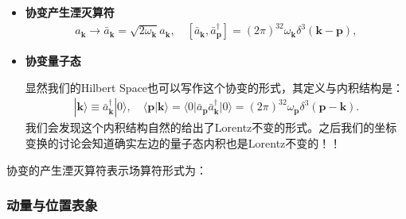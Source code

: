 \begin{itemize}
  \item \textbf{协变产生湮灭算符}
    \begin{align}
      a_\mathbf{k}\to \bar{a}_{\mathbf{k}} =
      \sqrt{2\omega_{\mathbf{k}}} a_{\mathbf{k}}, \quad
      \left[\bar{a}_{\mathbf{k}},\bar{a}_{\mathbf{p}}^{\dagger}\right]=(2\pi)^32\omega_{\mathbf{k}}\delta^3(\mathbf{k-p}),
    \end{align}
  \item \textbf{协变量子态}

    显然我们的Hilbert Space也可以写作这个协变的形式，其定义与内积结构是：
    \begin{align}
      | \mathbf{k}
      \rangle\equiv\bar{a}_{\mathbf{k}}^\dagger|0\rangle,\quad\langle
      \mathbf{p}|
      \mathbf{k}\rangle=\langle0|\bar{a}_{\mathbf{p}}\bar{a}_{\mathbf{k}}^\dagger|0\rangle=(2\pi)^32\omega_\mathbf{p}\delta^3(\mathbf{p-k}).
    \end{align}
    我们会发现这个内积结构自然的给出了Lorentz不变的形式。之后我们的坐标变换的讨论会知道确实左边的量子态内积也是Lorentz不变的！！
\end{itemize}

协变的产生湮灭算符表示场算符形式为：

\subsubsection{动量与位置表象}

